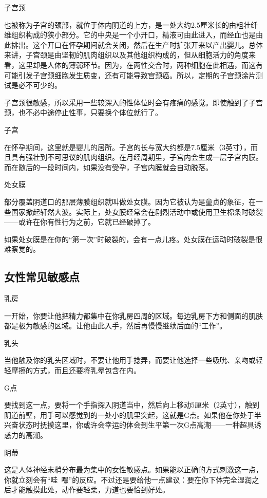\documentclass[12pt,UTF8,openany]{ctexbook}
\begin{document}
子宫颈

也被称为子宫的颈部，就位于体内阴道的上方，是一处大约2.5厘米长的由粗壮纤维组织构成的狭小部分。它的中央是一个小开口，精液可由此进入，而经血也是由此排出。这个开口在怀孕期间就会关闭，然后在生产时扩张开来以产出婴儿。总体来讲，子宫颈是由坚韧的肌肉组织以及其他组织构成的，但从细胞活力的角度来看，这里却是人体的薄弱环节。因为，在两性交合时，两种细胞在此相遇，而这有可能引发子宫颈细胞发生质变，还有可能导致宫颈癌。所以，定期的子宫颈涂片测试是必不可少的。

子宫颈很敏感，所以采用一些较深入的性体位时会有疼痛的感觉。即使触到了子宫颈，也不必中途停止性事，只要换个体位就行了。

子宫

在怀孕期间，这里就是婴儿的居所。子宫的长与宽大约都是7.5厘米（3英寸），而且具有强壮到不可思议的肌肉组织。在月经周期里，子宫内会生成一层子宫内膜。而在随后的一段时间内，如果没有受孕，子宫内膜就会自动脱落。

处女膜

部分覆盖阴道口的那层薄膜组织就叫做处女膜。因为它被认为是童贞的象征，在一些国家掀起轩然大波。实际上，处女膜经常会在剧烈活动中或使用卫生棉条时破裂——或许在你有性行为之前，它就已经破掉了。

如果处女膜是在你的“第一次”时破裂的，会有一点儿疼。处女膜在运动时破裂是很难察觉的。

\subsection*{女性常见敏感点}

乳房

一开始，你要让他把精力都集中在你乳房四周的区域。每边乳房下方和侧面的肌肤都是极为敏感的区域。让他由此入手，然后再慢慢继续后面的“工作”。

乳头

当他触及你的乳头区域时，不要让他用手捻弄，而要让他选择一些吸吮、亲吻或轻轻摩擦的方式，而且还要将乳晕包含在内。

G点

要找到这一点，要将一个手指探入阴道当中，然后向上移动5厘米（2英寸），触到阴道前壁，用手可以感觉到的一处小的肌里突起，这就是G点。如果他在你处于半兴奋状态时抚摸这里，你或许会幸运的体会到生平第一次G点高潮——一种超具诱惑力的高潮。

阴蒂

这是人体神经末梢分布最为集中的女性敏感点。如果能以正确的方式刺激这一点，你就立刻会有“哇~嘿”的反应。不过还是要给他一点建议：要在你下体完全湿润之后才能触摸此处，动作要轻柔，力道也要恰到好处。
\end{document}
